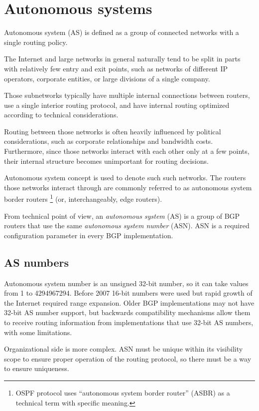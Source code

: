 \chapter{Autonomous systems}

Autonomous system (AS) is defined as a group of connected networks with a single routing policy\cite{rfc1930}.

The Internet and large networks in general naturally tend to be split in parts with relatively few
entry and exit points, such as networks of different IP operators, corporate entities, or large divisions
of a single company.

Those subnetworks typically have multiple internal connections between routers, use a single interior
routing protocol, and have internal routing optimized according to technical considerations.

Routing between those networks is often heavily influenced by political considerations, such as
corporate relationships and bandwidth costs. Furthermore, since those networks interact with each other
only at a few points, their internal structure becomes unimportant for routing decisions.

Autonomous system concept is used to denote such such networks. The routers those networks interact
through are commonly referred to as autonomous system border routers \footnote{OSPF protocol uses
``autonomous system border router'' (ASBR) as a technical term with specific meaning.} (or, interchangeably, edge routers).

From technical point of view, an \emph{autonomous system} (AS) is a group of BGP routers that use the same
\emph{autonomous system number} (ASN). ASN is a required configuration parameter in every BGP implementation.

\section{AS numbers}

Autonomous system number is an unsigned 32-bit number, so it can take values from 1 to 4294967294.
Before 2007 16-bit numbers were used but rapid growth of the Internet required range expansion\cite{rfc6793}.
Older BGP implementations may not have 32-bit AS number support, but backwards compatibility mechanisms allow
them to receive routing information from implementations that use 32-bit AS numbers, with some limitations.

Organizational side is more complex. ASN must be unique within its visibility scope to ensure proper
operation of the routing protocol, so there must be a way to ensure uniqueness.


